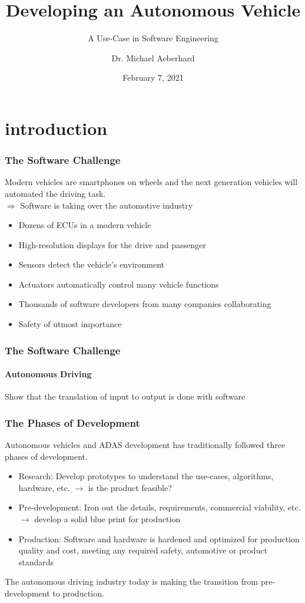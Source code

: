 \documentclass{beamer}
\title{Developing an Autonomous Vehicle}
\subtitle{A Use-Case in Software Engineering}
\author{Dr. Michael Aeberhard}
\institute{Apex.AI}
\date{February 7, 2021}
\begin{document}
\frame{\titlepage}

\section{introduction}




\begin{frame}
\frametitle{The Software Challenge}
Modern vehicles are smartphones on wheels and the next generation vehicles
will automated the driving task.\\
$\Rightarrow$ Software is taking over the automotive industry
\vspace{0.25cm}
\begin{itemize}
    \item Dozens of ECUs in a modern vehicle
    \item High-resolution displays for the drive and passenger
    \item Sensors detect the vehicle's environment
    \item Actuators automatically control many vehicle functions
    \item Thousands of software developers from many companies collaborating
    \item Safety of utmost importance
\end{itemize}
\end{frame}

\begin{frame}
\frametitle{The Software Challenge}
\framesubtitle{Autonomous Driving}
Show that the translation of input to output is done with software
\end{frame}

\begin{frame}
\frametitle{The Phases of Development}
Autonomous vehicles and ADAS development has traditionally followed three phases
of development.

\begin{itemize}
    \item Research: Develop prototypes to understand the use-cases, algorithms,
        hardware, etc. $\rightarrow$ is the product feasible?
    \item Pre-development: Iron out the details, requirements, commercial
        viability, etc. $\rightarrow$ develop a solid blue print for production
    \item Production: Software and hardware is hardened and optimized for
        production quality and cost, meeting any required safety, automotive or
        product standards
\end{itemize}
\begin{block}{}
The autonomous driving industry today is making the transition from
pre-development to production.
\end{block}
\end{frame}
\end{document}
